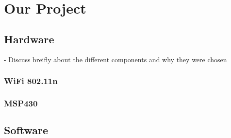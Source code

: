 \documentclass[journal,transmag]{IEEEtran}
\begin{document}
\section{Our Project}

\subsection{Hardware}
 \-- Discuss breifly about the different components and why they were chosen \\

\subsubsection{WiFi 802.11n \\}
\subsubsection{MSP430 \\}


\subsection{Software}
\end{document}
